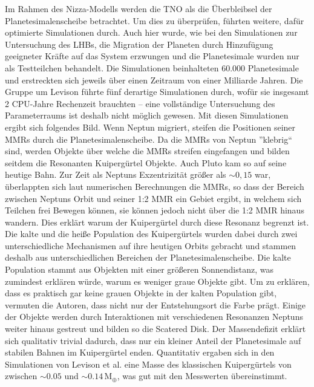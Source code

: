 \documentclass[12pt,a4paper,twoside]{article}
\newcommand{\ME}{\,\mathrm{M_\oplus}}
\begin{document}
\noindent
Im Rahmen des Nizza-Modells werden die TNO als die Überbleibsel der Planetesimalenscheibe betrachtet.
Um dies zu überprüfen, führten \cite{Levison2008} weitere, dafür optimierte Simulationen durch. Auch hier wurde, wie bei den Simulationen zur Untersuchung des LHBs, die Migration der Planeten durch Hinzufügung geeigneter Kräfte auf das System erzwungen und die Planetesimale wurden nur als Testteilchen behandelt\cite{Levison2008}. %
Die Simulationen beinhalteten 60.000 Planetesimale und erstreckten sich jeweils über einen Zeitraum von einer Milliarde Jahren\cite{Levison2008}. Die Gruppe um Levison führte fünf derartige Simulationen durch, wofür sie insgesamt 2 CPU-Jahre Rechenzeit brauchten – eine vollständige Untersuchung des Parameterraums ist deshalb nicht möglich gewesen\cite{Levison2008}.
Mit diesen Simulationen ergibt sich folgendes Bild. %
Wenn Neptun migriert, steifen die Positionen seiner MMRs durch die Planetesimalenscheibe. Da die MMRs von Neptun ''klebrig`` sind\cite{Levison2008}, werden Objekte über welche die MMRs streifen eingefangen und bilden seitdem die Resonanten Kuipergürtel Objekte. Auch Pluto kam so auf seine heutige Bahn.
Zur Zeit als Neptuns Exzentrizität größer als $\sim 0,15$ war, überlappten sich laut numerischen Berechnungen die MMRs, so dass der Bereich zwischen Neptuns Orbit und seiner 1:2 MMR ein Gebiet ergibt, in welchem sich Teilchen frei Bewegen können, sie können jedoch nicht über die 1:2 MMR hinaus wandern\cite{Levison2008}. Dies erklärt warum der Kuipergürtel durch diese Resonanz begrenzt ist.
Die kalte und die heiße Population des Kuipergürtels wurden dabei durch zwei unterschiedliche Mechanismen auf ihre heutigen Orbits gebracht und stammen deshalb aus unterschiedlichen Bereichen der Planetesimalenscheibe. Die kalte Population stammt aus Objekten mit einer größeren Sonnendistanz, was zumindest erklären würde, warum es weniger graue Objekte gibt. Um zu erklären, dass es praktisch gar keine grauen Objekte in der kalten Population gibt, vermuten die Autoren, dass nicht nur der Entstehungsort die Farbe prägt\cite{Levison2008}. %
Einige der Objekte werden durch Interaktionen mit verschiedenen Resonanzen Neptuns weiter hinaus gestreut und bilden so die Scatered Disk. %
Der Massendefizit erklärt sich qualitativ trivial dadurch, dass nur ein kleiner Anteil der Planetesimale auf stabilen Bahnen im Kuipergürtel enden. Quantitativ ergaben sich in den Simulationen von Levison et al. eine Masse des klassischen Kuipergürtels von zwischen $\sim0.05$ und $\sim0.14 \ME$, was gut mit den Messwerten übereinstimmt\cite{Levison2008}.
\end{document}
